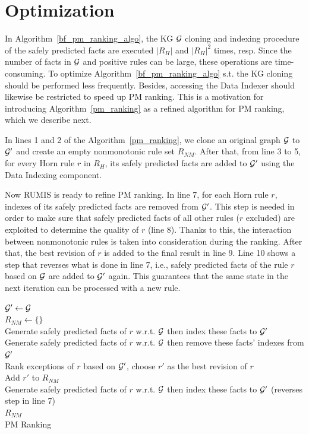 \section{Optimization}

In Algorithm~\ref{bf_pm_ranking_algo}, the KG $\mathcal{G}$ cloning and indexing procedure of the safely predicted facts are executed $|R_H|$ and $|R_H|^2$ times, resp. Since the number of facts in $\mathcal{G}$ and positive rules can be large, these operations are time-consuming. To optimize Algorithm~\ref{bf_pm_ranking_algo} s.t. the KG cloning should be performed less frequently. Besides, accessing the Data Indexer should likewise be restricted to speed up PM ranking. This is a motivation for introducing Algorithm~\ref{pm_ranking} as a refined algorithm for PM ranking, which we describe next.

In lines 1 and 2 of the Algorithm~\ref{pm_ranking}, we clone an original graph $\mathcal{G}$ to $\mathcal{G}'$ and create an empty nonmonotonic rule set $R_{NM}$. After that, from line 3 to 5, for every Horn rule $r$ in $R_H$, its safely predicted facts are added to $\mathcal{G}'$ using the Data Indexing component.

Now RUMIS is ready to refine PM ranking. In line 7, for each Horn rule $r$, indexes of its safely predicted facts are removed from $\mathcal{G}'$. This step is needed in order to make sure that safely predicted facts of all other rules ($r$ excluded) are exploited to determine the quality of $r$ (line 8). Thanks to this, the interaction between nonmonotonic rules is taken into consideration during the ranking. After that, the best revision of $r$ is added to the final result in line 9. Line 10 shows a step that reverses what is done in line 7, i.e., safely predicted facts of the rule $r$ based on $\mathcal{G}$ are added to $\mathcal{G}'$ again. This guarantees that the same state in the next iteration can be processed with a new rule.

\IncMargin{1.5em}
\begin{algorithm}[H]
\DontPrintSemicolon
\SetAlgoLined
{}
\BlankLine
$\mathcal{G}' \leftarrow \mathcal{G}$\\
$R_{NM} \leftarrow \{\}$\\
\BlankLine
{} {
	Generate safely predicted facts of $r$ w.r.t. $\mathcal{G}$ then index these facts to $\mathcal{G}'$\\
}
\BlankLine
{} {
	Generate safely predicted facts of $r$ w.r.t. $\mathcal{G}$ then remove these facts' indexes from $\mathcal{G}'$\\
	Rank exceptions of $r$ based on $\mathcal{G}'$, choose $r'$ as the best revision of $r$\\
	Add $r'$ to $R_{NM}$\\
	Generate safely predicted facts of $r$ w.r.t. $\mathcal{G}$ then index these facts to $\mathcal{G}'$ (reverses step in line 7)\\
}
\Return $R_{NM}$\\
\caption{PM Ranking}
\label{pm_ranking_algo}
\end{algorithm}
\DecMargin{1.5em}


